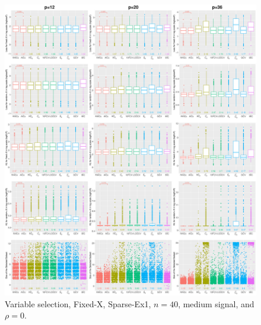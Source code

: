 \begin{figure}[!ht]
\centering
\includegraphics[width=\textwidth]{figures/supplement/fixedx/subset_selection/Sparse-Ex1_n40_msnr_rho0.eps}
\caption{Variable selection, Fixed-X, Sparse-Ex1, $n=40$, medium signal, and $\rho=0$.}
\end{figure}
\clearpage

